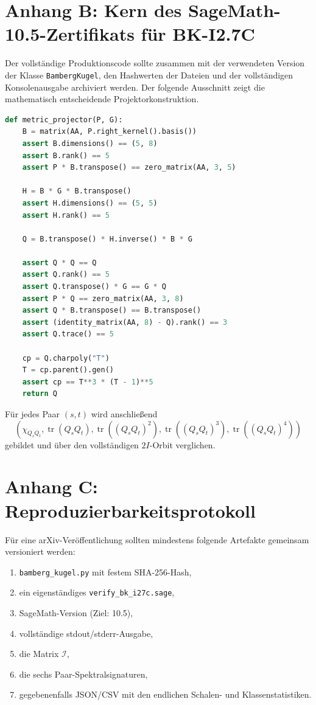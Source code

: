 \documentclass[11pt,a4paper]{article}
\theoremstyle{definition}
\theoremstyle{remark}
\begin{document}
\section{Anhang B: Kern des SageMath-10.5-Zertifikats für BK-I2.7C}
Der vollständige Produktionscode sollte zusammen mit der verwendeten Version der Klasse \texttt{BambergKugel}, den Hashwerten der Dateien und der vollständigen Konsolenausgabe archiviert werden. Der folgende Ausschnitt zeigt die mathematisch entscheidende Projektorkonstruktion.

\begin{lstlisting}[language=Python]
def metric_projector(P, G):
    B = matrix(AA, P.right_kernel().basis())
    assert B.dimensions() == (5, 8)
    assert B.rank() == 5
    assert P * B.transpose() == zero_matrix(AA, 3, 5)

    H = B * G * B.transpose()
    assert H.dimensions() == (5, 5)
    assert H.rank() == 5

    Q = B.transpose() * H.inverse() * B * G

    assert Q * Q == Q
    assert Q.rank() == 5
    assert Q.transpose() * G == G * Q
    assert P * Q == zero_matrix(AA, 3, 8)
    assert Q * B.transpose() == B.transpose()
    assert (identity_matrix(AA, 8) - Q).rank() == 3
    assert Q.trace() == 5

    cp = Q.charpoly("T")
    T = cp.parent().gen()
    assert cp == T**3 * (T - 1)**5
    return Q
\end{lstlisting}

Für jedes Paar $(s,t)$ wird anschließend
\[
\left(
\chi_{Q_sQ_t},
\operatorname{tr}(Q_sQ_t),
\operatorname{tr}((Q_sQ_t)^2),
\operatorname{tr}((Q_sQ_t)^3),
\operatorname{tr}((Q_sQ_t)^4)
\right)
\]
gebildet und über den vollständigen $2I$-Orbit verglichen.

\section{Anhang C: Reproduzierbarkeitsprotokoll}
Für eine arXiv-Veröffentlichung sollten mindestens folgende Artefakte gemeinsam versioniert werden:
\begin{enumerate}
\item \texttt{bamberg\_kugel.py} mit festem SHA-256-Hash,
\item ein eigenständiges \texttt{verify\_bk\_i27c.sage},
\item SageMath-Version (Ziel: 10.5),
\item vollständige stdout/stderr-Ausgabe,
\item die Matrix $\mathcal I$,
\item die sechs Paar-Spektralsignaturen,
\item gegebenenfalls JSON/CSV mit den endlichen Schalen- und Klassenstatistiken.
\end{enumerate}
\end{document}
